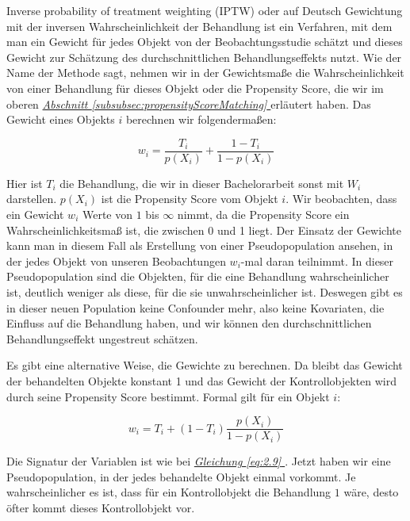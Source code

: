 \documentclass[12pt,a4paper,twoside]{scrartcl}
\numberwithin{equation}{section}
\newcommand{\refsec}[1]{\emph{\hyperref[#1]{Abschnitt \ref*{#1} }}}
\renewcommand*{\refeq}[1]{\emph{\hyperref[#1]{Gleichung \ref*{#1} }}}
\begin{document}
Inverse probability of treatment weighting (IPTW) oder auf Deutsch Gewichtung mit der inversen Wahrscheinlichkeit der Behandlung ist ein Verfahren, mit dem man ein Gewicht für jedes Objekt von der Beobachtungsstudie schätzt und dieses Gewicht zur Schätzung des durchschnittlichen Behandlungseffekts nutzt. Wie der Name der Methode sagt, nehmen wir in der Gewichtsmaße die Wahrscheinlichkeit von einer Behandlung für dieses Objekt oder die Propensity Score, die wir im oberen \refsec{subsubsec:propensityScoreMatching} erläutert haben. Das Gewicht eines Objekts $i$ berechnen wir folgendermaßen: \par

\begin{equation}\label{eq:2.9}
  w_i = \frac{T_i}{p(X_i)} + \frac{1-T_i}{1-p(X_i)}
\end{equation}

\noindent
Hier ist $T_i$ die Behandlung, die wir in dieser Bachelorarbeit sonst mit $W_i$ darstellen. $p(X_i)$ ist die Propensity Score vom Objekt $i$. Wir beobachten, dass ein Gewicht $w_i$ Werte von $1$ bis $\infty$ nimmt, da die Propensity Score ein Wahrscheinlichkeitsmaß ist, die zwischen 0 und 1 liegt. Der Einsatz der Gewichte kann man in diesem Fall als Erstellung von einer Pseudopopulation ansehen, in der jedes Objekt von unseren Beobachtungen $w_i$-mal daran teilnimmt. In dieser Pseudopopulation sind die Objekten, für die eine Behandlung wahrscheinlicher ist, deutlich weniger als diese, für die sie unwahrscheinlicher ist. Deswegen gibt es in dieser neuen Population keine Confounder mehr, also keine Kovariaten, die Einfluss auf die Behandlung haben, und wir können den durchschnittlichen Behandlungseffekt ungestreut schätzen\cite{robins2000marginal}. 
\par 

\noindent
Es gibt eine alternative Weise, die Gewichte zu berechnen. Da bleibt das Gewicht der behandelten Objekte konstant 1 und das Gewicht der Kontrollobjekten wird durch seine Propensity Score bestimmt. Formal gilt für ein Objekt $i$:\par

\begin{equation}\label{eq:2.10}
  w_i = T_i + (1-T_i) \frac{p(X_i)}{1-p(X_i)}
\end{equation}

\noindent
Die Signatur der Variablen ist wie bei \refeq{eq:2.9}. Jetzt haben wir eine Pseudopopulation, in der jedes behandelte Objekt einmal vorkommt. Je wahrscheinlicher es ist, dass für ein Kontrollobjekt die Behandlung $1$ wäre, desto öfter kommt dieses Kontrollobjekt vor\cite{hirano2003efficient}.\par
\end{document}

